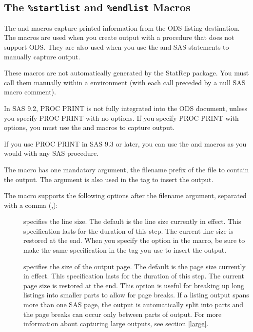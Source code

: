 \documentclass[article,oneside]{memoir}
\newcommand*{\StatRep}{\textsf{StatRep}\xspace}
\begin{document}
 \subsection{The \texttt{\%startlist} and \texttt{\%endlist} Macros}\label{startlist}

  The  and  macros capture printed information
  from the ODS listing destination. The macros are used when
  you create output with a procedure that does not support ODS.
  They are also used when you use the
   and  SAS statements to
  manually capture output.

  These macros are not automatically generated by the \StatRep package.
  You must call them
  manually within a  environment (with each call preceded
  by a null SAS macro comment).

  In SAS 9.2, PROC PRINT is not fully integrated into the ODS document,
  unless you specify PROC PRINT with no options.
  If you specify PROC PRINT
  with options, you must use the  and 
  macros to capture output.

  If you use PROC PRINT in SAS 9.3 or later,
  you can use the  and  macros as you would with
  any SAS procedure.

  The  macro has one mandatory argument, the filename prefix
  of the file to contain
  the output. The argument is also used
  in the  tag to insert the output.

  The  macro supports the following options after
  the filename argument, separated with a comma (,):
  \begin{description}
  \item[] specifies the line size.
  The default is the line size currently in effect.
  This specification lasts for the duration of this step.
  The current line size is restored at the end.
  When you specify the  option in the 
  macro, be sure to make the same specification
  in the  tag you use to insert the output.

  \item[] specifies the size of the output page.
   The default is the page size currently in effect.
   This specification lasts for the duration of this step.
  The current page size is restored at the end.
  This option is useful for breaking up long listings into smaller parts to allow for page breaks.
  If a listing output spans more than one SAS page,
  the output is automatically split into parts and the page breaks
  can occur only between parts of output.
  For more information about capturing large outputs, see section \ref{large}.
  \end{description}
\end{document}
